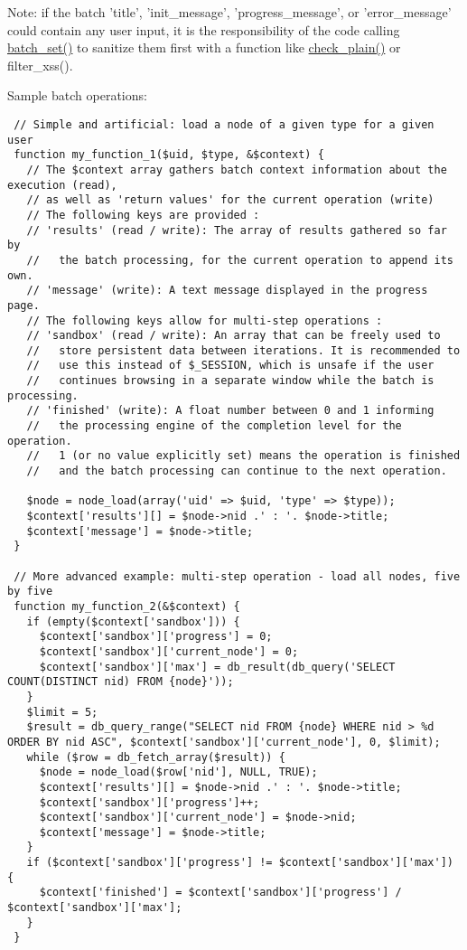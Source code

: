 Note: if the batch 'title', 'init\_\-message', 'progress\_\-message', or 'error\_\-message' could contain any user input, it is the responsibility of the code calling \hyperlink{group__batch_g9ff3f18b3bdd1d62ab7ac681a22a7170}{batch\_\-set()} to sanitize them first with a function like \hyperlink{bootstrap_8inc_76fc67a30fd8d75ddd80565e6e65a13d}{check\_\-plain()} or filter\_\-xss().

Sample batch operations: 

\begin{Code}\begin{verbatim} // Simple and artificial: load a node of a given type for a given user
 function my_function_1($uid, $type, &$context) {
   // The $context array gathers batch context information about the execution (read),
   // as well as 'return values' for the current operation (write)
   // The following keys are provided :
   // 'results' (read / write): The array of results gathered so far by
   //   the batch processing, for the current operation to append its own.
   // 'message' (write): A text message displayed in the progress page.
   // The following keys allow for multi-step operations :
   // 'sandbox' (read / write): An array that can be freely used to
   //   store persistent data between iterations. It is recommended to
   //   use this instead of $_SESSION, which is unsafe if the user
   //   continues browsing in a separate window while the batch is processing.
   // 'finished' (write): A float number between 0 and 1 informing
   //   the processing engine of the completion level for the operation.
   //   1 (or no value explicitly set) means the operation is finished
   //   and the batch processing can continue to the next operation.

   $node = node_load(array('uid' => $uid, 'type' => $type));
   $context['results'][] = $node->nid .' : '. $node->title;
   $context['message'] = $node->title;
 }

 // More advanced example: multi-step operation - load all nodes, five by five
 function my_function_2(&$context) {
   if (empty($context['sandbox'])) {
     $context['sandbox']['progress'] = 0;
     $context['sandbox']['current_node'] = 0;
     $context['sandbox']['max'] = db_result(db_query('SELECT COUNT(DISTINCT nid) FROM {node}'));
   }
   $limit = 5;
   $result = db_query_range("SELECT nid FROM {node} WHERE nid > %d ORDER BY nid ASC", $context['sandbox']['current_node'], 0, $limit);
   while ($row = db_fetch_array($result)) {
     $node = node_load($row['nid'], NULL, TRUE);
     $context['results'][] = $node->nid .' : '. $node->title;
     $context['sandbox']['progress']++;
     $context['sandbox']['current_node'] = $node->nid;
     $context['message'] = $node->title;
   }
   if ($context['sandbox']['progress'] != $context['sandbox']['max']) {
     $context['finished'] = $context['sandbox']['progress'] / $context['sandbox']['max'];
   }
 }
\end{verbatim}
\end{Code}



